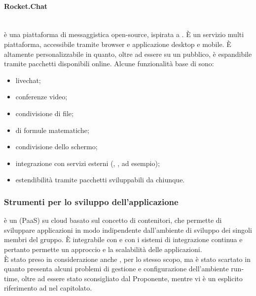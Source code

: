 \paragraph{Rocket.Chat}\mbox{}\\
 è una piattaforma di messaggistica open-source, ispirata a . \`{E} un servizio multi piattaforma, accessibile tramite browser e applicazione desktop e mobile. \`{E} altamente personalizzabile in quanto, oltre ad essere su un  pubblico, è espandibile tramite pacchetti disponibili online. Alcune funzionalità base di  sono:
\begin{itemize}
	\item livechat;
	\item conferenze video;
	\item condivisione di file;
	\item {} di formule matematiche;
	\item condivisione dello schermo;
	\item integrazione con servizi esterni (, ,  ad esempio);
	\item estendibilità tramite pacchetti sviluppabili da chiunque.
\end{itemize}

\subsubsection{Strumenti per lo sviluppo dell'applicazione}
\textbf{} è un  (PaaS) su cloud basato sul concetto di contenitori, che permette di sviluppare applicazioni in modo indipendente dall'ambiente di sviluppo dei singoli membri del gruppo. \`{E} integrabile con  e con i sistemi di integrazione continua e pertanto permette un approccio  e la scalabilità delle applicazioni.\\
\`{E} stato preso in considerazione anche , per lo stesso scopo, ma è stato scartato in quanto presenta alcuni problemi di gestione e configurazione dell'ambiente run-time, oltre ad essere stato sconsigliato dal Proponente, mentre vi è un esplicito riferimento ad  nel capitolato.

